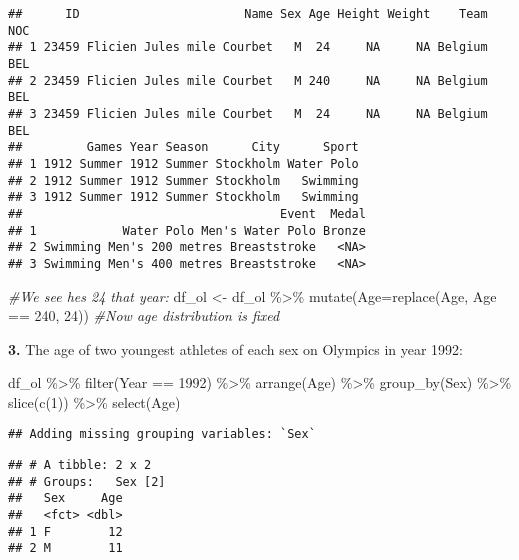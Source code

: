 \documentclass[
]{article}
\newenvironment{Shaded}{\begin{snugshade}}{\end{snugshade}}
\newcommand{\AttributeTok}[1]{\textcolor[rgb]{0.77,0.63,0.00}{#1}}
\newcommand{\CommentTok}[1]{\textcolor[rgb]{0.56,0.35,0.01}{\textit{#1}}}
\newcommand{\DecValTok}[1]{\textcolor[rgb]{0.00,0.00,0.81}{#1}}
\newcommand{\FunctionTok}[1]{\textcolor[rgb]{0.00,0.00,0.00}{#1}}
\newcommand{\NormalTok}[1]{#1}
\newcommand{\OtherTok}[1]{\textcolor[rgb]{0.56,0.35,0.01}{#1}}
\newcommand{\SpecialCharTok}[1]{\textcolor[rgb]{0.00,0.00,0.00}{#1}}
\begin{document}
\begin{verbatim}
##      ID                       Name Sex Age Height Weight    Team NOC
## 1 23459 Flicien Jules mile Courbet   M  24     NA     NA Belgium BEL
## 2 23459 Flicien Jules mile Courbet   M 240     NA     NA Belgium BEL
## 3 23459 Flicien Jules mile Courbet   M  24     NA     NA Belgium BEL
##         Games Year Season      City      Sport
## 1 1912 Summer 1912 Summer Stockholm Water Polo
## 2 1912 Summer 1912 Summer Stockholm   Swimming
## 3 1912 Summer 1912 Summer Stockholm   Swimming
##                                    Event  Medal
## 1            Water Polo Men's Water Polo Bronze
## 2 Swimming Men's 200 metres Breaststroke   <NA>
## 3 Swimming Men's 400 metres Breaststroke   <NA>
\end{verbatim}

\begin{Shaded}
\begin{Highlighting}[]
\CommentTok{\#We see he\textquotesingle{}s 24 that year:}
\NormalTok{df\_ol }\OtherTok{\textless{}{-}}\NormalTok{ df\_ol }\SpecialCharTok{\%\textgreater{}\%}  \FunctionTok{mutate}\NormalTok{(}\AttributeTok{Age=}\FunctionTok{replace}\NormalTok{(Age, Age }\SpecialCharTok{==} \DecValTok{240}\NormalTok{, }\DecValTok{24}\NormalTok{))}
\CommentTok{\#Now age distribution is fixed}
\end{Highlighting}
\end{Shaded}

\textbf{3.} The age of two youngest athletes of each sex on Olympics in
year 1992:

\begin{Shaded}
\begin{Highlighting}[]
\NormalTok{df\_ol }\SpecialCharTok{\%\textgreater{}\%} \FunctionTok{filter}\NormalTok{(Year }\SpecialCharTok{==} \DecValTok{1992}\NormalTok{) }\SpecialCharTok{\%\textgreater{}\%} \FunctionTok{arrange}\NormalTok{(Age) }\SpecialCharTok{\%\textgreater{}\%} \FunctionTok{group\_by}\NormalTok{(Sex) }\SpecialCharTok{\%\textgreater{}\%} \FunctionTok{slice}\NormalTok{(}\FunctionTok{c}\NormalTok{(}\DecValTok{1}\NormalTok{)) }\SpecialCharTok{\%\textgreater{}\%} \FunctionTok{select}\NormalTok{(Age)}
\end{Highlighting}
\end{Shaded}

\begin{verbatim}
## Adding missing grouping variables: `Sex`
\end{verbatim}

\begin{verbatim}
## # A tibble: 2 x 2
## # Groups:   Sex [2]
##   Sex     Age
##   <fct> <dbl>
## 1 F        12
## 2 M        11
\end{verbatim}
\end{document}
